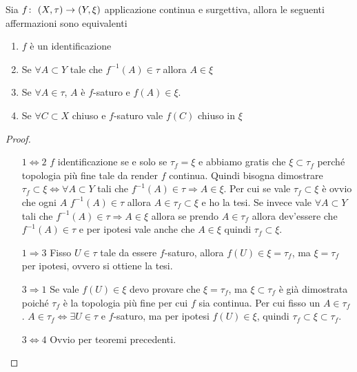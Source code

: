 \begin{theorem}
	\label{crtident}
	Sia $f \colon\ (X,\tau) \rightarrow (Y, \xi)$ applicazione continua e surgettiva, allora le seguenti affermazioni sono equivalenti
	\begin{enumerate}
		\item $f$ è un identificazione
		\item Se $\forall A \subset Y$  tale che $f^{-1}(A) \in \tau$ allora $A \in \xi$
		\item Se $\forall A \in \tau$, $A$ è $f$-saturo e $f(A) \in \xi$.
		\item Se $\forall C \subset X$ chiuso e $f$-saturo vale $f(C)$ chiuso in $\xi$
	\end{enumerate}
\end{theorem}
\begin{proof}
	\begin{enumerate}
		\item[$1 \Leftrightarrow 2$] $f$ identificazione se e solo se $\tau_f = \xi$ e abbiamo gratis che $\xi \subset \tau_f$ perché topologia più fine tale da render $f$ continua. Quindi bisogna dimostrare $\tau_f \subset \xi \Longleftrightarrow \forall A \subset Y$ tali che $f^{-1}(A) \in \tau \Rightarrow A \in \xi$. Per cui se vale $\tau_f \subset \xi$ è ovvio che ogni $A$ $f^{-1}(A) \in \tau$ allora $A \in \tau_f \subset \xi$ e ho la tesi. Se invece vale $\forall A \subset Y$ tali che $f^{-1}(A) \in \tau \Rightarrow A \in \xi$ allora se prendo $A \in \tau_f$ allora dev'essere che $f^{-1}(A) \in \tau$ e per ipotesi vale anche che $A \in \xi$ quindi $\tau_f \subset \xi$. 
		\item[$1 \Rightarrow 3$] Fisso $U \in \tau$ tale da essere $f$-saturo, allora $f(U) \in \xi = \tau_f$, ma $\xi = \tau_f$ per ipotesi, ovvero si ottiene la tesi.
		\item[$3 \Rightarrow 1$] Se vale $f(U) \in \xi$ devo provare che $\xi = \tau_f$, ma $\xi \subset \tau_f$ è già dimostrata poiché $\tau_f$ è la topologia più fine per cui $f$ sia continua. Per cui fisso un $A \in \tau_f$. $A \in \tau_f \Leftrightarrow \exists U \in \tau$ e $f$-saturo, ma per ipotesi $f(U) \in \xi$, quindi $\tau_f \subset \xi \subset \tau_f$.
		\item[$3\Leftrightarrow 4$] Ovvio per teoremi precedenti.
	\end{enumerate}
\end{proof}


